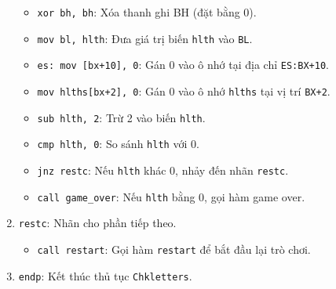 \documentclass[12pt]{article}
\begin{document}
\begin{enumerate}[label=\textbf{\arabic*.}]
    \begin{itemize}
        \item \texttt{xor bh, bh}: Xóa thanh ghi BH (đặt bằng 0).
        \item \texttt{mov bl, hlth}: Đưa giá trị biến \texttt{hlth} vào \texttt{BL}.
        \item \texttt{es: mov [bx+10], 0}: Gán 0 vào ô nhớ tại địa chỉ \texttt{ES:BX+10}.
        \item \texttt{mov hlths[bx+2], 0}: Gán 0 vào ô nhớ \texttt{hlths} tại vị trí \texttt{BX+2}.
        \item \texttt{sub hlth, 2}: Trừ 2 vào biến \texttt{hlth}.
        \item \texttt{cmp hlth, 0}: So sánh \texttt{hlth} với 0.
        \item \texttt{jnz restc}: Nếu \texttt{hlth} khác 0, nhảy đến nhãn \texttt{restc}.
        \item \texttt{call game\_over}: Nếu \texttt{hlth} bằng 0, gọi hàm game over.
    \end{itemize}
    
    \item \texttt{restc}: Nhãn cho phần tiếp theo.
    
    \begin{itemize}
        \item \texttt{call restart}: Gọi hàm \texttt{restart} để bắt đầu lại trò chơi.
    \end{itemize}
    
    \item \texttt{endp}: Kết thúc thủ tục \texttt{Chkletters}.
\end{enumerate}
\end{document}
